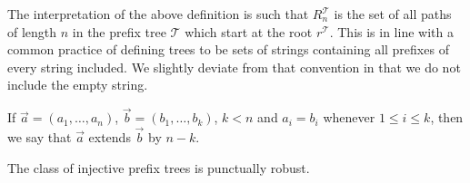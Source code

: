 \documentclass[a4paper,UKenglish,cleveref, autoref, thm-restate]{lipics-v2021}
\begin{document}
The interpretation of the above definition is such that $R_n^{\mathcal{T}}$ is the set of all paths of length $n$ in the prefix tree $\mathcal{T}$ which start at the root $r^{\mathcal{T}}$. This is in line with a common practice of defining trees to be sets of strings containing all prefixes of every string included. We  slightly deviate from that convention in that we do not include the empty string.

\begin{definition}
    If $\vec{a}=(a_1,\dots,a_n)$, $\vec{b}=(b_1,\dots,b_k)$, $k<n$ and $a_i=b_i$ whenever $1 \leq i \leq k$, then we say that $\vec{a}$ extends $\vec{b}$ by $n-k$.
\end{definition}

\begin{theorem}\label{pref}
    The class of injective prefix trees is punctually robust.
\end{theorem}
\end{document}
